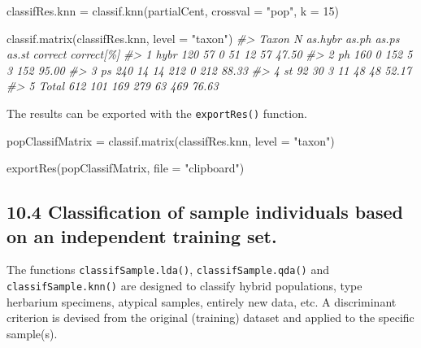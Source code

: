 \documentclass[
  11pt,
  a4paper]{article}
\newenvironment{Shaded}{\begin{snugshade}}{\end{snugshade}}
\newcommand{\AttributeTok}[1]{\textcolor[rgb]{0.77,0.63,0.00}{#1}}
\newcommand{\CommentTok}[1]{\textcolor[rgb]{0.56,0.35,0.01}{\textit{#1}}}
\newcommand{\DecValTok}[1]{\textcolor[rgb]{0.00,0.00,0.81}{#1}}
\newcommand{\FunctionTok}[1]{\textcolor[rgb]{0.00,0.00,0.00}{#1}}
\newcommand{\NormalTok}[1]{#1}
\newcommand{\OtherTok}[1]{\textcolor[rgb]{0.56,0.35,0.01}{#1}}
\newcommand{\StringTok}[1]{\textcolor[rgb]{0.31,0.60,0.02}{#1}}
\begin{document}
\begin{Shaded}
\begin{Highlighting}[]
\NormalTok{classifRes.knn }\OtherTok{=} \FunctionTok{classif.knn}\NormalTok{(partialCent, }\AttributeTok{crossval =} \StringTok{"pop"}\NormalTok{, }\AttributeTok{k =} \DecValTok{15}\NormalTok{)}

\FunctionTok{classif.matrix}\NormalTok{(classifRes.knn, }\AttributeTok{level =} \StringTok{"taxon"}\NormalTok{)}
\CommentTok{\#\textgreater{}   Taxon   N as.hybr as.ph as.ps as.st correct correct[\%]}
\CommentTok{\#\textgreater{} 1  hybr 120      57     0    51    12      57      47.50}
\CommentTok{\#\textgreater{} 2    ph 160       0   152     5     3     152      95.00}
\CommentTok{\#\textgreater{} 3    ps 240      14    14   212     0     212      88.33}
\CommentTok{\#\textgreater{} 4    st  92      30     3    11    48      48      52.17}
\CommentTok{\#\textgreater{} 5 Total 612     101   169   279    63     469      76.63}
\end{Highlighting}
\end{Shaded}

The results can be exported with the \texttt{exportRes()} function.

\begin{Shaded}
\begin{Highlighting}[]
\NormalTok{popClassifMatrix }\OtherTok{=} \FunctionTok{classif.matrix}\NormalTok{(classifRes.knn, }\AttributeTok{level =} \StringTok{"taxon"}\NormalTok{)}

\FunctionTok{exportRes}\NormalTok{(popClassifMatrix, }\AttributeTok{file =} \StringTok{"clipboard"}\NormalTok{)}
\end{Highlighting}
\end{Shaded}

\hypertarget{classification-of-sample-individuals-based-on-an-independent-training-set.}{%
\subsection{10.4 Classification of sample individuals based on an
independent training
set.}\label{classification-of-sample-individuals-based-on-an-independent-training-set.}}

The functions \texttt{classifSample.lda()}, \texttt{classifSample.qda()}
and \texttt{classifSample.knn()} are designed to classify hybrid
populations, type herbarium specimens, atypical samples, entirely new
data, etc. A discriminant criterion is devised from the original
(training) dataset and applied to the specific sample(s).
\end{document}
